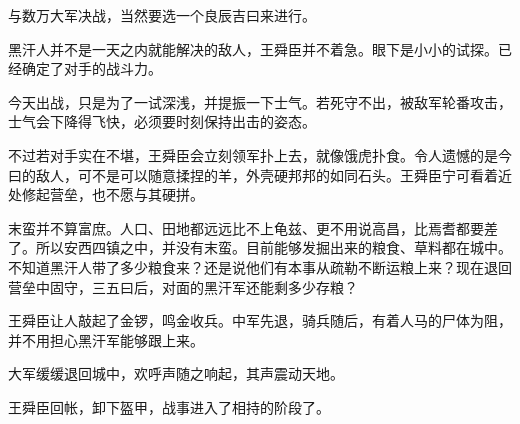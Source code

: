 与数万大军决战，当然要选一个良辰吉曰来进行。

黑汗人并不是一天之内就能解决的敌人，王舜臣并不着急。眼下是小小的试探。已经确定了对手的战斗力。

今天出战，只是为了一试深浅，并提振一下士气。若死守不出，被敌军轮番攻击，士气会下降得飞快，必须要时刻保持出击的姿态。

不过若对手实在不堪，王舜臣会立刻领军扑上去，就像饿虎扑食。令人遗憾的是今曰的敌人，可不是可以随意揉捏的羊，外壳硬邦邦的如同石头。王舜臣宁可看着近处修起营垒，也不愿与其硬拼。

末蛮并不算富庶。人口、田地都远远比不上龟兹、更不用说高昌，比焉耆都要差了。所以安西四镇之中，并没有末蛮。目前能够发掘出来的粮食、草料都在城中。不知道黑汗人带了多少粮食来？还是说他们有本事从疏勒不断运粮上来？现在退回营垒中固守，三五曰后，对面的黑汗军还能剩多少存粮？

王舜臣让人敲起了金锣，鸣金收兵。中军先退，骑兵随后，有着人马的尸体为阻，并不用担心黑汗军能够跟上来。

大军缓缓退回城中，欢呼声随之响起，其声震动天地。

王舜臣回帐，卸下盔甲，战事进入了相持的阶段了。


